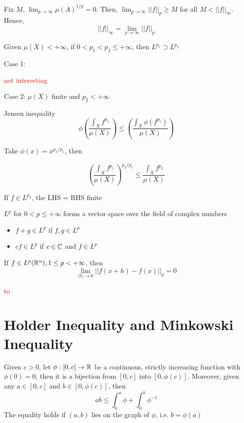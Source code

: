 \documentclass{report}
\begin{document}
Fix $M$, $\lim_{p \to \infty} \mu(A)^{1/p} = 0$. Then, $\lim_{p \to \infty} ||f||_p \geq M$ for all $M < ||f||_\infty$. Hence,
\[
    ||f||_\infty = \lim_{p \to \infty} ||f||_p
\]

\begin{proposition}
    Given $\mu(X) < +\infty$, if $0 < p_1 < p_2 \leq +\infty$, then $L^{p_1} \supset L^{p_2}$
\end{proposition}

Case 1:

\textcolor{red}{not interesting}

Case 2: $\mu(X)$ finite and $p_2 < +\infty$

Jensen inequality
\[
    \phi \left( \frac{\int_X f^{p_1}}{\mu(X)} \right) \leq  \left( \frac{\int_X \phi(f^{p_1})}{\mu(X)} \right)
\]

Take $\phi(x) = x^{p_2/p_1}$, then

\[
    \left( \frac{\int_X f^{p_1}}{\mu(X)} \right)^{p_2/p_1} \leq  \frac{\int_X f^{p_2}}{\mu(X)}
\]

If $f \in L^{p_2}$, the LHS = RHS finite

\begin{proposition}
    $L^p$ for $0 < p \leq +\infty$ forms a vector space over the field of complex numbers
    \begin{itemize}
        \item $f + g \in L^p$ if $f, g \in L^p$
        \item $cf \in L^p$ if $c \in \mathbb{C}$ and $f \in L^p$
    \end{itemize}
\end{proposition}

\begin{proposition}[Continuity of $L^p(\R^n)$]
    If $f \in L^p(\mathbb{R}^n), 1 \leq p < +\infty$, then
    \[
        \lim_{|h| \to 0} ||f(x + h) - f(x)||_p = 0
    \]
\end{proposition}

\textcolor{red}{to}

\section{Holder Inequality and Minkowski Inequality}

\begin{lemma}
    Given $c > 0$, let $\phi: [0, c] \to \mathbb{R}$ be a continuous, strictly increasing function with $\phi(0) = 0$, then it is a bijection from $[0, c]$ into $[0, \phi(c)]$. Moreover, given any $a \in [0, c]$ and $b \in [0, \phi(c)]$, then
    \[
        ab \leq \int_0^a \phi + \int_0^b \phi^{-1}
    \]
    The equality holds if $(a, b)$ lies on the graph of $\phi$, i.e. $b = \phi(a)$
\end{lemma}
\end{document}
